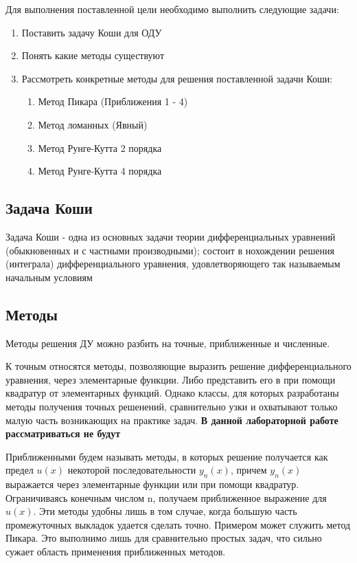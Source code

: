 \documentclass[12pt,a4paper]{scrartcl}
\begin{document}
	
	Для выполнения поставленной цели необходимо выполнить следующие задачи:
	\begin{enumerate}
		\item Поставить задачу Коши для ОДУ
		\item Понять какие методы существуют
		\item Рассмотреть конкретные методы для решения поставленной задачи Коши: \begin{enumerate}
			\item Метод Пикара (Приближения 1 - 4)
			\item Метод ломанных (Явный)
			\item Метод Рунге-Кутта 2 порядка
			\item Метод Рунге-Кутта 4 порядка
		\end{enumerate}
	\end{enumerate}

	\subsection{Задача Коши}
	Задача Коши - одна из основных задачи теории дифференциальных уравнений (обыкновенных и с частными производными); состоит в нохождении решения (интеграла) дифференциального уравнения, удовлетворяющего так называемым начальным условиям
	
	\subsection{Методы}
	
	Методы решения ДУ можно разбить на точные, приближенные и численные. 
	
	К точным относятся методы, позволяющие выразить решение дифференциального уравнения, через элементарные функции. 
	Либо представить его в при помощи квадратур от элементарных функций. Однако классы, для которых разработаны методы получения точных решенений, сравнительно узки и охватывают только малую часть возникающих на практике задач. \textbf{В данной лабораторной работе рассматриваться не будут }
	
	Приближенными будем называть методы, в которых решение получается как предел $u(x)$ некоторой последовательности $y_n(x)$, причем $y_n(x)$ выражается через элементарные функции или при помощи квадратур. 
	Ограничиваясь конечным числом n, получаем приближенное выражение для $u(x)$. 
	Эти методы удобны лишь в том случае, когда большую часть промежуточных выкладок удается сделать точно. Примером может служить метод Пикара.
	Это выполнимо лишь для сравнительно простых задач, что сильно сужает область применения приближенных методов.
	
\end{document}
